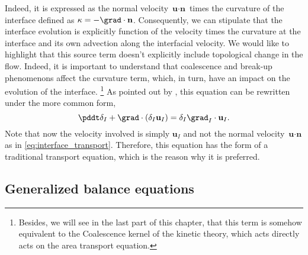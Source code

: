 Indeed, it is expressed as the normal velocity $\textbf{u}\cdot\textbf{n}$ times the curvature of the interface defined as $\kappa = - \grad \cdot \textbf{n}$.
Consequently, we can stipulate that the interface evolution is explicitly function of the velocity times the curvature at the interface and its own advection along the interfacial velocity. 
We would like to highlight that this source term doesn't explicitly include topological change in the flow. 
Indeed, it is important to understand that coalescence and break-up phenomenons affect the curvature term, which, in turn, have an impact on the evolution of the interface. 
\footnote{Besides, we will see in the last part of this chapter, that this term is somehow equivalent to the Coalescence kernel of the kinetic theory, which acts directly acts on the area transport equation.} 
As pointed out by \citet{morel2007surface}, this equation can be rewritten under the more common form,
\begin{equation}
    \pddt \delta_I
    + \grad \cdot (\delta_I \textbf{u}_I)
    = \delta_I \grad_I \cdot \textbf{u}_I.
    \label{eq:interface_transport2}
\end{equation}
Note that now the velocity involved is simply $\textbf{u}_I$ and not the normal velocity $\textbf{u} \cdot \textbf{n}$ as in \ref{eq:interface_transport}.
Therefore, this equation has the form of a traditional transport equation, which is the reason why it is preferred. 

\subsection{Generalized balance equations}

